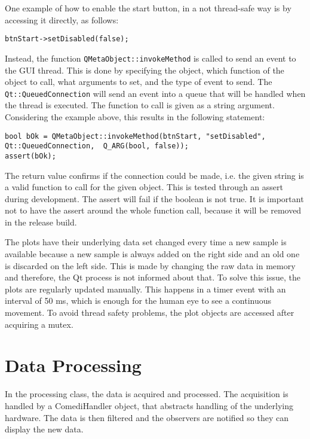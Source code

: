 One example of how to enable the start button, in a not thread-safe way is by accessing it directly, as follows: 

\begin{verbatim}  
btnStart->setDisabled(false);
\end{verbatim}

Instead, the function \texttt{QMetaObject::invokeMethod} is called to send an event to the GUI thread. This is done by specifying the object, which function of the object to call, what arguments to set, and the type of event to send. The \texttt{Qt::QueuedConnection} will send an event into a queue that will be handled when the thread is executed. The function to call is given as a string argument. Considering the example above, this results in the following statement:

\begin{verbatim}  
bool bOk = QMetaObject::invokeMethod(btnStart, "setDisabled", Qt::QueuedConnection,  Q_ARG(bool, false));
assert(bOk);
\end{verbatim}

The return value confirms if the connection could be made, i.e. the given string is a valid function to call for the given object. This is tested through an assert during development. The assert will fail if the boolean is not true. It is important not to have the assert around the whole function call, because it will be removed in the release build. 

The plots have their underlying data set changed every time a new sample is available because a new sample is always added on the right side and an old one is discarded on the left side. This is made by changing the raw data in memory and therefore, the Qt process is not informed about that. To solve this issue, the plots are regularly updated manually. This happens in a timer event with an interval of 50 ms, which is enough for the human eye to see a continuous movement. To avoid thread safety problems, the plot objects are accessed after acquiring a mutex.

\section{Data Processing}
In the processing class, the data is acquired and processed. The acquisition is handled by a ComediHandler object, that abstracts handling of the underlying hardware. The data is then filtered and the observers are notified so they can display the new data. 

